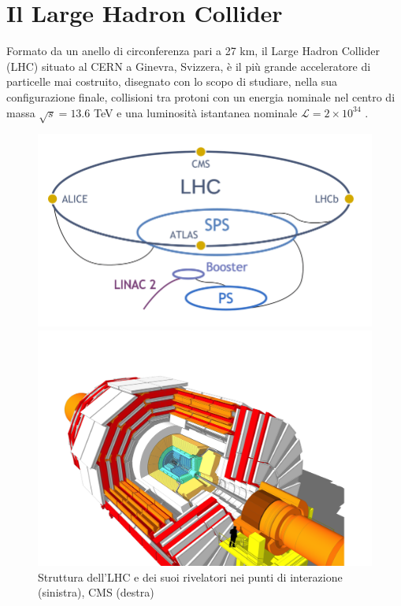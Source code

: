 \section{Il Large Hadron Collider}
\label{sec:LHC}
Formato da un anello di circonferenza pari a 27 km, il Large Hadron Collider (LHC) situato al CERN a Ginevra, Svizzera, è il più grande acceleratore di particelle mai costruito, disegnato con lo scopo di studiare, nella sua configurazione finale, collisioni tra protoni con un energia nominale nel centro di massa $\sqrt{s} = 13.6$ TeV e una luminosità istantanea nominale $\mathcal{L} = 2 \times 10^{34}$ \Lumi. 
\begin{figure}[t]
  \centering
  \begin{minipage}[b]{0.43\textwidth}
      \centering
      \includegraphics[width=\textwidth]{../ImmaginiTesi/LHC.png} 
  \end{minipage}
  \hfill 
  \begin{minipage}[b]{0.56\textwidth}
      \centering
      \includegraphics[width=\textwidth]{../ImmaginiTesi/CMS.png} 
  \end{minipage}
  \caption{Struttura dell'LHC e dei suoi rivelatori nei punti di interazione (sinistra), CMS (destra)}
  \label{fig:LHC-CMS}
\end{figure}



